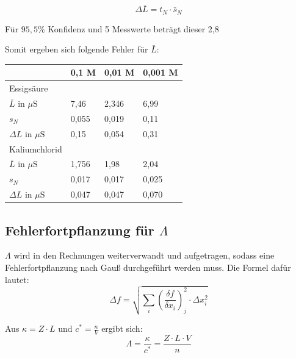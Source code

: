 \documentclass[12pt,a4paper,titlepage,headinclude,bibtotoc]{scrartcl}
\begin{document}
\begin{equation}
\Delta \bar{L} = t_N \cdot \bar{s}_N
\end{equation}

Für $95,5 \%$ Konfidenz und 5 Messwerte beträgt dieser 2,8\protect\footnotemark



Somit ergeben sich folgende Fehler für $\bar{L}$:

\begin{table} [h]
\centering 
\begin{tabular}{|p{4cm}||p{2cm}|p{2cm}|p{2cm}|}
\hline
& 0,1 M & 0,01 M & 0,001 M \\
\hline
Essigsäure & & & \\
$\bar{L}$ in $\mu \mathrm{S}$ &7,46 & 2,346 & 6,99\\
$s_N$ & 0,055 & 0,019 & 0,11 \\
$\Delta L$ in $\mu \mathrm{S}$ & 0,15& 0,054& 0,31\\
\hline
Kaliumchlorid & & &\\
$\bar{L}$ in $\mu \mathrm{S}$& 1,756 & 1,98 & 2,04\\
$s_N$& 0,017 & 0,017 & 0,025\\
$\Delta L$ in $\mu \mathrm{S}$ & 0,047& 0,047& 0,070\\
\hline
\end{tabular}
\end{table}

\subsection{Fehlerfortpflanzung für $\Lambda$}
$\Lambda$ wird in den Rechnungen weiterverwandt und aufgetragen, sodass eine Fehlerfortpflanzung nach Gauß durchgeführt werden muss. Die Formel dafür lautet:\\

\begin{equation}
\Delta f = \sqrt{\sum_i \left(\frac{\delta f}{\delta x_i}\right)^2_j \cdot \Delta x_i^2}
\end{equation}

Aus $\kappa = Z \cdot L$ und $c^* =\frac{n}{V}$ ergibt sich:\\

\begin{equation}
\Lambda = \frac{\kappa}{c^*}= \frac{Z \cdot L \cdot V}{n}
\end{equation}
\end{document}
